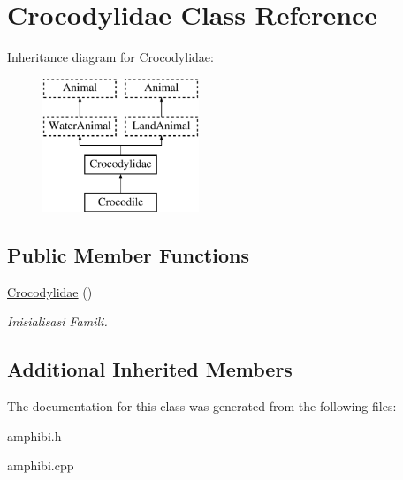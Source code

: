 \hypertarget{class_crocodylidae}{}\section{Crocodylidae Class Reference}
\label{class_crocodylidae}
Inheritance diagram for Crocodylidae\+:\begin{figure}[H]
\begin{center}
\leavevmode
\includegraphics[height=4.000000cm]{class_crocodylidae}
\end{center}
\end{figure}
\subsection*{Public Member Functions}
\begin{DoxyCompactItemize}
\item 
\hyperlink{class_crocodylidae_a066f512e7b656ff65cf632525fa66d8a}{Crocodylidae} ()\hypertarget{class_crocodylidae_a066f512e7b656ff65cf632525fa66d8a}{}\label{class_crocodylidae_a066f512e7b656ff65cf632525fa66d8a}

\begin{DoxyCompactList}\small\item\em Inisialisasi Famili. \end{DoxyCompactList}\end{DoxyCompactItemize}
\subsection*{Additional Inherited Members}


The documentation for this class was generated from the following files\+:\begin{DoxyCompactItemize}
\item 
amphibi.\+h\item 
amphibi.\+cpp\end{DoxyCompactItemize}
